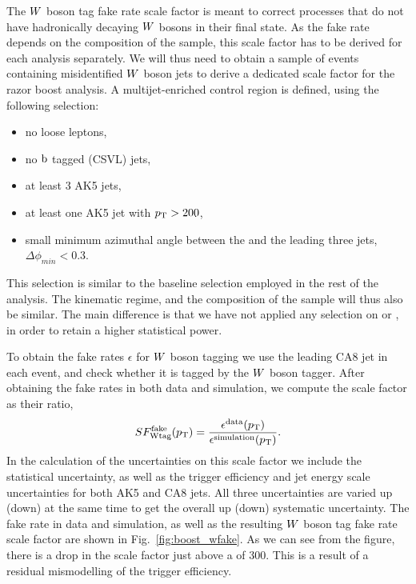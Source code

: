 The $W$ boson tag fake rate scale factor is meant to correct processes that do not have
hadronically decaying $W$ bosons in their final state. As the fake rate depends on the composition
of the sample, this scale factor has to be derived for each analysis separately. 
We will thus need to obtain a sample of events containing misidentified $W$ boson jets to derive a
dedicated scale factor for the razor boost analysis. A multijet-enriched control region is defined,
using the following selection:
\begin{itemize}
\item no loose leptons, 
\item no $\mathrm{b}$ tagged (CSVL) jets,
\item at least 3 AK5 jets,
\item at least one AK5 jet with $p_{\mathrm{T}}>200$\GeV,
\item small minimum azimuthal angle between the \VEtmiss and the leading three jets, \\
$\Delta\phi_{min} < 0.3$.
\end{itemize}
This selection is similar to the baseline selection employed in the rest of the analysis. The
kinematic regime, and the composition of the sample will thus also be similar. The main difference
is that we have not applied any selection on \mr or \rsq, in order to retain a higher statistical
power. 

To obtain the fake rates $\epsilon$ for $W$ boson tagging we use the leading CA8 jet in each
event, and check whether it is tagged by the $W$ boson tagger. After obtaining the
fake rates in both data and simulation, we compute the scale factor as their ratio,
\begin{equation}
SF_\textrm{Wtag}^\textrm{fake}(p_{\mathrm{T}}) =
\frac{\epsilon^{\textrm{data}}(p_{\mathrm{T}})}{\epsilon^{\textrm{simulation}}(p_{\mathrm{T}})}.
\end{equation} 
In the calculation of the uncertainties on this scale factor we include the statistical uncertainty,
as well as the trigger efficiency and jet energy scale uncertainties for both AK5 and CA8 jets. 
All three uncertainties are varied up (down) at the same time to get the overall up (down)
systematic  uncertainty.
The fake rate in data and simulation, as well as the resulting $W$ boson tag fake rate scale factor
are shown in Fig.~\ref{fig:boost_wfake}. As we can see from the figure, there is a drop in the scale
factor just above a \pt of 300\GeV. This is a result of a residual mismodelling of the trigger
efficiency. 



